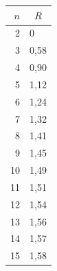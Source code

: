 \begin{table}[h] %

\begin{minipage}[t]{27mm}

\vspace*{-12pt}

{\small %

\begin{center}


\vspace*{2ex}



\tabcolsep=11pt

\begin{tabular}{|r|l|}

\hline

$n$&\multicolumn{1}{c|}{$R$}\\

\hline

2&0\\

3&0,58\\

4&0,90\\

5&1,12\\

6&1,24\\

7&1,32\\

8&1,41\\

9&1,45\\

10&1,49\\

11&1,51\\

12&1,54\\

13&1,56\\

14&1,57\\

15&1,58\\

\hline

\end{tabular}

\end{center}

}
\end{minipage}
\end{table}
